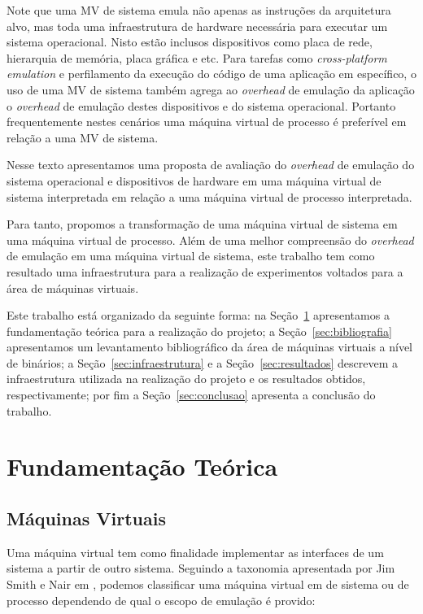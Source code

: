 \documentclass[11pt,twoside]{article}
\begin{document}
Note que uma MV de sistema emula não apenas as instruções da arquitetura alvo,
mas toda uma infraestrutura de hardware necessária para executar um sistema
operacional.  Nisto estão inclusos dispositivos como placa de rede, hierarquia
de memória, placa gráfica e etc.  Para tarefas como \emph{cross-platform
  emulation} e perfilamento da execução do código de uma aplicação em
específico, o uso de uma MV de sistema também agrega ao \emph{overhead} de
emulação da aplicação o \emph{overhead} de emulação destes dispositivos e do
sistema operacional.  Portanto frequentemente nestes cenários uma máquina
virtual de processo é preferível em relação a uma MV de sistema.

Nesse texto apresentamos uma proposta de avaliação do \emph{overhead} de
emulação do sistema operacional e dispositivos de hardware em uma máquina
virtual de sistema interpretada em relação a uma máquina virtual de processo
interpretada.

Para tanto, propomos a transformação de uma máquina virtual de sistema em uma
máquina virtual de processo.  Além de uma melhor compreensão do
\emph{overhead} de emulação em uma máquina virtual de sistema, este trabalho
tem como resultado uma infraestrutura para a realização de experimentos voltados
para a área de máquinas virtuais.

Este trabalho está organizado da seguinte forma: na
Seção~\ref{sec:fundamentacao} apresentamos a fundamentação teórica para a
realização do projeto; a Seção~\ref{sec:bibliografia} apresentamos um
levantamento bibliográfico da área de máquinas virtuais a nível de binários; a
Seção~\ref{sec:infraestrutura} e a Seção~\ref{sec:resultados} descrevem a
infraestrutura utilizada na realização do projeto e os resultados obtidos,
respectivamente; por fim a Seção~\ref{sec:conclusao} apresenta a conclusão do
trabalho.
  
\section{Fundamentação Teórica} \label{sec:fundamentacao}

\subsection{Máquinas Virtuais}

Uma máquina virtual tem como finalidade implementar as interfaces de um sistema
a partir de outro sistema.  Seguindo a taxonomia apresentada por Jim Smith e
Nair em \cite{Smith2005}, podemos classificar uma máquina virtual em de sistema
ou de processo dependendo de qual o escopo de emulação é provido:
\end{document}
